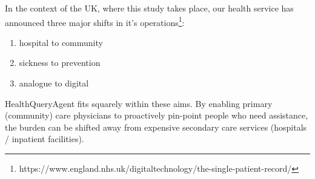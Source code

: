 \documentclass[11pt]{article}
\begin{document}


In the context of the UK, where this study takes place, our health service has announced three major shifts in it's operations\footnote{https://www.england.nhs.uk/digitaltechnology/the-single-patient-record/}:

\begin{enumerate}
	\item hospital to community
	\item sickness to prevention
	\item analogue to digital
\end{enumerate}

HealthQueryAgent fits squarely within these aims. By enabling primary (community) care physicians to proactively pin-point people who need assistance, the burden can be shifted away from expensive secondary care services (hospitals / inpatient facilities).





\end{document}
